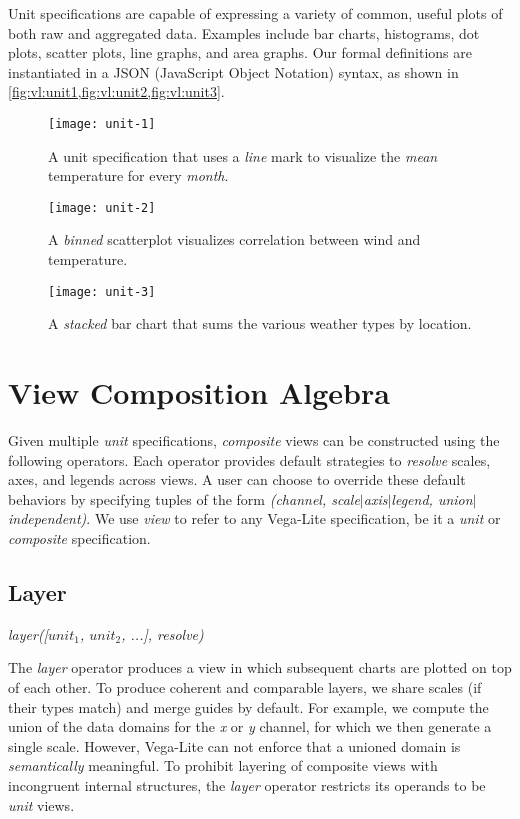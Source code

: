 Unit specifications are capable of expressing a variety of common, useful plots
of both raw and aggregated data. Examples include bar charts, histograms, dot
plots, scatter plots, line graphs, and area graphs. Our formal definitions are
instantiated in a JSON (JavaScript Object Notation) syntax, as shown in
\cref{fig:vl:unit1,fig:vl:unit2,fig:vl:unit3}.

\begin{figure}[h!]
\centering
  \texttt{[image: unit-1]}
  \caption{A unit specification that uses a \emph{line} mark to visualize the
  \emph{mean} temperature for every \emph{month}.}
  \label{fig:vl:unit1}
\end{figure}

\begin{figure}[h!]
  \centering
  \texttt{[image: unit-2]}
  \caption{A \emph{binned} scatterplot visualizes correlation between wind
  and temperature.}
  \label{fig:vl:unit2}
\end{figure}

\begin{figure}[h!]
  \centering
  \texttt{[image: unit-3]}
  \caption{A \emph{stacked} bar chart that sums the various weather types by
  location.}
  \label{fig:vl:unit3}
\end{figure}

\newpage
\section{View Composition Algebra}

Given multiple \emph{unit} specifications, \emph{composite} views can be
constructed using the following operators. Each operator provides default
strategies to \emph{resolve} scales, axes, and legends across views. A user can
choose to override these default behaviors by specifying tuples of the form
\emph{(channel, scale$|$axis$|$legend, union$|$independent)}. We use \emph{view}
to refer to any Vega-Lite specification, be it a \emph{unit} or \emph{composite}
specification.

\subsection{Layer}

\centerline{
  \emph{layer([$unit_1$, $unit_2$, ...], resolve)}
}

The \emph{layer} operator produces a view in which subsequent charts are plotted
on top of each other. To produce coherent and comparable layers, we share scales
(if their types match) and merge guides by default. For example, we compute the
union of the data domains for the \emph{x} or \emph{y} channel, for which we
then generate a single scale. However, Vega-Lite can not enforce that a unioned
domain is \emph{semantically} meaningful. To prohibit layering of composite
views with incongruent internal structures, the \emph{layer} operator restricts
its operands to be \emph{unit} views.

